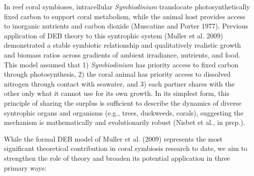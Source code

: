 \documentclass[]{elsarticle} %
\begin{document}
In reef coral symbioses, intracellular \emph{Symbiodinium} translocate
photosynthetically fixed carbon to support coral metabolism, while the
animal host provides access to inorganic nutrients and carbon dioxide
(Muscatine and Porter 1977). Previous application of DEB theory to this
syntrophic system (Muller et al. 2009) demonstrated a stable symbiotic
relationship and qualitatively realistic growth and biomass ratios
across gradients of ambient irradiance, nutrients, and food. This model
assumed that 1) \emph{Symbiodinium} has priority access to fixed carbon
through photosynthesis, 2) the coral animal has priority access to
dissolved nitrogen through contact with seawater, and 3) each partner
shares with the other only what it cannot use for its own growth. In its
simplest form, this principle of sharing the surplus is sufficient to
describe the dynamics of diverse syntrophic organs and organisms (e.g.,
trees, duckweeds, corals), suggesting the mechanism is mathematically
and evolutionarily robust (Nisbet et al., in prep.).

While the formal DEB model of Muller et al. (2009) represents the most
significant theoretical contribution in coral symbiosis research to
date, we aim to strengthen the role of theory and broaden its potential
application in three primary ways:
\end{document}
